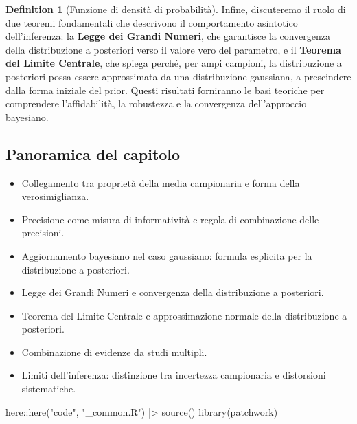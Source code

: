 \documentclass[
  letterpaper,
  DIV=11,
  numbers=noendperiod,
  oneside]{scrreprt}
\newenvironment{Shaded}{\begin{snugshade}}{\end{snugshade}}
\newcommand{\FunctionTok}[1]{\textcolor[rgb]{0.28,0.35,0.67}{#1}}
\newcommand{\NormalTok}[1]{\textcolor[rgb]{0.00,0.23,0.31}{#1}}
\newcommand{\SpecialCharTok}[1]{\textcolor[rgb]{0.37,0.37,0.37}{#1}}
\newcommand{\StringTok}[1]{\textcolor[rgb]{0.13,0.47,0.30}{#1}}
\providecommand{\tightlist}{%
  \setlength{\itemsep}{0pt}\setlength{\parskip}{0pt}}
\theoremstyle{definition}
\theoremstyle{plain}
\theoremstyle{definition}
\newtheorem{definition}{Definition}[chapter]
\theoremstyle{remark}
\begin{document}
\begin{definition}[Funzione di densità di
probabilità]
Infine, discuteremo il ruolo di due teoremi fondamentali che descrivono
il comportamento asintotico dell'inferenza: la \textbf{Legge dei Grandi
Numeri}, che garantisce la convergenza della distribuzione a posteriori
verso il valore vero del parametro, e il \textbf{Teorema del Limite
Centrale}, che spiega perché, per ampi campioni, la distribuzione a
posteriori possa essere approssimata da una distribuzione gaussiana, a
prescindere dalla forma iniziale del prior. Questi risultati forniranno
le basi teoriche per comprendere l'affidabilità, la robustezza e la
convergenza dell'approccio bayesiano.

\subsection*{Panoramica del capitolo}\label{panoramica-del-capitolo-10}

\begin{itemize}
\tightlist
\item
  Collegamento tra proprietà della media campionaria e forma della
  verosimiglianza.
\item
  Precisione come misura di informatività e regola di combinazione delle
  precisioni.
\item
  Aggiornamento bayesiano nel caso gaussiano: formula esplicita per la
  distribuzione a posteriori.
\item
  Legge dei Grandi Numeri e convergenza della distribuzione a
  posteriori.
\item
  Teorema del Limite Centrale e approssimazione normale della
  distribuzione a posteriori.
\item
  Combinazione di evidenze da studi multipli.
\item
  Limiti dell'inferenza: distinzione tra incertezza campionaria e
  distorsioni sistematiche.
\end{itemize}

\begin{tcolorbox}[enhanced jigsaw, arc=.35mm, breakable, colbacktitle=quarto-callout-caution-color!10!white, opacityback=0, toprule=.15mm, rightrule=.15mm, colback=white, opacitybacktitle=0.6, leftrule=.75mm, coltitle=black, bottomtitle=1mm, left=2mm, toptitle=1mm, title=\textcolor{quarto-callout-caution-color}{\faFire}\hspace{0.5em}{Preparazione del Notebook}, titlerule=0mm, bottomrule=.15mm, colframe=quarto-callout-caution-color-frame]

\begin{Shaded}
\begin{Highlighting}[]
\NormalTok{here}\SpecialCharTok{::}\FunctionTok{here}\NormalTok{(}\StringTok{"code"}\NormalTok{, }\StringTok{"\_common.R"}\NormalTok{) }\SpecialCharTok{|\textgreater{}} 
  \FunctionTok{source}\NormalTok{()}
\FunctionTok{library}\NormalTok{(patchwork)}
\end{Highlighting}
\end{Shaded}


\end{tcolorbox}
\end{definition}
\end{document}
